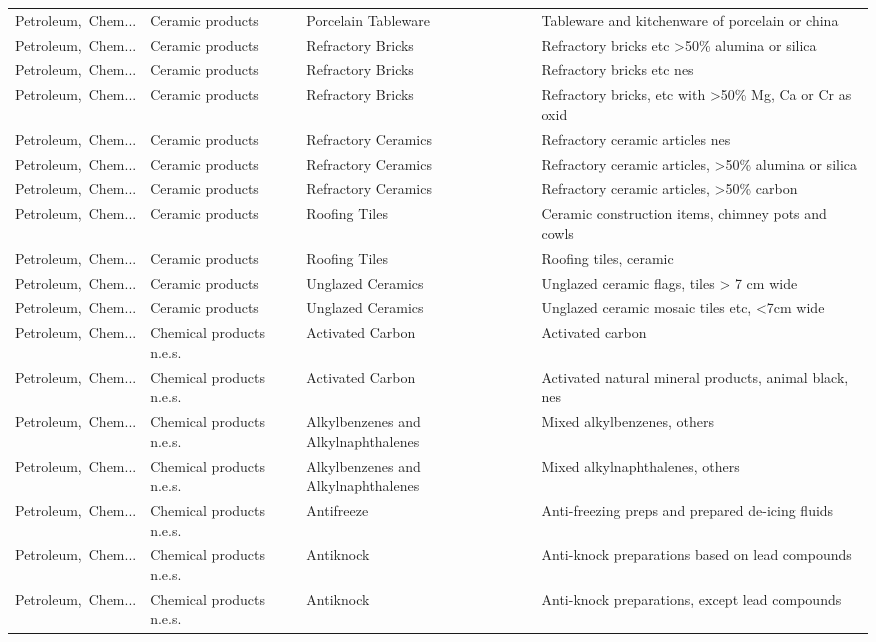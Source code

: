 \begin{appendices}
\begin{xltabular}{\textwidth}{|p{0.10\textwidth}|p{0.25\textwidth}|p{0.24\textwidth}|p{0.31\textwidth}|}
Petroleum,\ Chem... & Ceramic products & Porcelain Tableware & Tableware and kitchenware of porcelain or china \\
Petroleum,\ Chem... & Ceramic products & Refractory Bricks & Refractory bricks etc >50\% alumina or silica \\
Petroleum,\ Chem... & Ceramic products & Refractory Bricks & Refractory bricks etc nes \\
Petroleum,\ Chem... & Ceramic products & Refractory Bricks & Refractory bricks, etc with >50\% Mg, Ca or Cr as oxid \\
Petroleum,\ Chem... & Ceramic products & Refractory Ceramics & Refractory ceramic articles nes \\
Petroleum,\ Chem... & Ceramic products & Refractory Ceramics & Refractory ceramic articles, >50\% alumina or silica \\
Petroleum,\ Chem... & Ceramic products & Refractory Ceramics & Refractory ceramic articles, >50\% carbon \\
Petroleum,\ Chem... & Ceramic products & Roofing Tiles & Ceramic construction items, chimney pots and cowls \\
Petroleum,\ Chem... & Ceramic products & Roofing Tiles & Roofing tiles, ceramic \\
Petroleum,\ Chem... & Ceramic products & Unglazed Ceramics & Unglazed ceramic flags, tiles > 7 cm wide \\
Petroleum,\ Chem... & Ceramic products & Unglazed Ceramics & Unglazed ceramic mosaic tiles etc, <7cm wide \\
Petroleum,\ Chem... & Chemical products n.e.s. & Activated Carbon & Activated carbon \\
Petroleum,\ Chem... & Chemical products n.e.s. & Activated Carbon & Activated natural mineral products, animal black, nes \\
Petroleum,\ Chem... & Chemical products n.e.s. & Alkylbenzenes and Alkylnaphthalenes & Mixed alkylbenzenes, others \\
Petroleum,\ Chem... & Chemical products n.e.s. & Alkylbenzenes and Alkylnaphthalenes & Mixed alkylnaphthalenes, others \\
Petroleum,\ Chem... & Chemical products n.e.s. & Antifreeze & Anti-freezing preps and prepared de-icing fluids \\
Petroleum,\ Chem... & Chemical products n.e.s. & Antiknock & Anti-knock preparations based on lead compounds \\
Petroleum,\ Chem... & Chemical products n.e.s. & Antiknock & Anti-knock preparations, except lead compounds \\

\end{xltabular}
\end{appendices}
